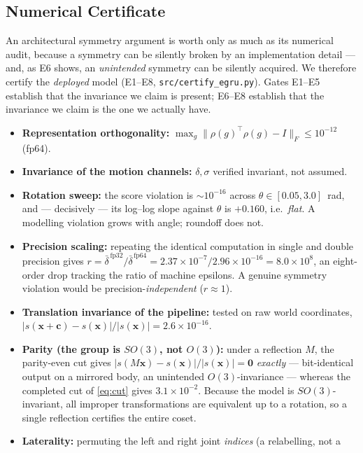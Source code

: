 \subsection{Numerical Certificate}
\label{sec:method:cert}

An architectural symmetry argument is worth only as much as its numerical audit, because a symmetry
can be silently broken by an implementation detail --- and, as E6 shows, an \emph{unintended} symmetry
can be silently acquired. We therefore certify the \emph{deployed} model
(E1--E8, \texttt{src/certify\_egru.py}). Gates E1--E5 establish that the invariance we claim is
present; E6--E8 establish that the invariance we claim is the one we actually have.

\begin{itemize}
\item[E1] \textbf{Representation orthogonality:}
$\max_g\|\rho(g)^{\!\top}\rho(g)-I\|_F\le10^{-12}$ (fp64).
\item[E2] \textbf{Invariance of the motion channels:} $\delta,\sigma$ verified invariant, not assumed.
\item[E3] \textbf{Rotation sweep:} the score violation is $\sim\!10^{-16}$ across
$\theta\in[0.05,3.0]$~rad, and --- decisively --- its log--log slope against $\theta$ is $+0.160$,
i.e.\ \emph{flat}. A modelling violation grows with angle; roundoff does not.
\item[E4] \textbf{Precision scaling:} repeating the identical computation in single and double
precision gives
$r=\bar\delta^{\,\mathrm{fp32}}/\bar\delta^{\,\mathrm{fp64}}
=2.37\times10^{-7}/2.96\times10^{-16}=8.0\times10^{8}$,
an eight-order drop tracking the ratio of machine epsilons. A genuine symmetry violation would be
precision-\emph{independent} ($r\approx1$).
\item[E5] \textbf{Translation invariance of the pipeline:} tested on raw world coordinates,
$|s(\bm{x}+\bm{c})-s(\bm{x})|/|s(\bm{x})|=2.6\times10^{-16}$.
\item[E6] \textbf{Parity (the group is $SO(3)$, not $O(3)$):} under a reflection $M$, the
parity-even cut gives $|s(M\bm{x})-s(\bm{x})|/|s(\bm{x})|=\mathbf{0}$ \emph{exactly} --- bit-identical
output on a mirrored body, an unintended $O(3)$-invariance --- whereas the completed cut of
\eqref{eq:cut} gives $3.1\times10^{-2}$. Because the model is $SO(3)$-invariant, all improper
transformations are equivalent up to a rotation, so a single reflection certifies the entire coset.
\item[E7] \textbf{Laterality:} permuting the left and right joint \emph{indices} (a relabelling, not a

\end{itemize}

